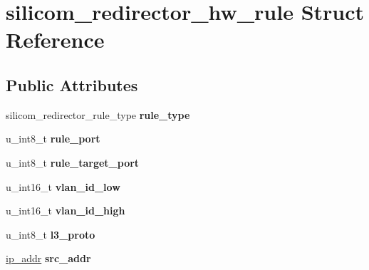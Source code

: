 \hypertarget{structsilicom__redirector__hw__rule}{
\section{silicom\_\-redirector\_\-hw\_\-rule Struct Reference}
\label{structsilicom__redirector__hw__rule}
}
\subsection*{Public Attributes}
\begin{DoxyCompactItemize}
\item 
\hypertarget{structsilicom__redirector__hw__rule_a94400e38ce1dbe2076efb81a71312cad}{
silicom\_\-redirector\_\-rule\_\-type {\bfseries rule\_\-type}}
\label{structsilicom__redirector__hw__rule_a94400e38ce1dbe2076efb81a71312cad}

\item 
\hypertarget{structsilicom__redirector__hw__rule_a68b2d4ea6dda27a16525a857ec9579fc}{
u\_\-int8\_\-t {\bfseries rule\_\-port}}
\label{structsilicom__redirector__hw__rule_a68b2d4ea6dda27a16525a857ec9579fc}

\item 
\hypertarget{structsilicom__redirector__hw__rule_ac38f745295b828ed7499fc415475ec9f}{
u\_\-int8\_\-t {\bfseries rule\_\-target\_\-port}}
\label{structsilicom__redirector__hw__rule_ac38f745295b828ed7499fc415475ec9f}

\item 
\hypertarget{structsilicom__redirector__hw__rule_a7f5b0833487ddc9dabb3278274e35c2e}{
u\_\-int16\_\-t {\bfseries vlan\_\-id\_\-low}}
\label{structsilicom__redirector__hw__rule_a7f5b0833487ddc9dabb3278274e35c2e}

\item 
\hypertarget{structsilicom__redirector__hw__rule_a3b32c6d67f73e69c6a073b5d4f47c900}{
u\_\-int16\_\-t {\bfseries vlan\_\-id\_\-high}}
\label{structsilicom__redirector__hw__rule_a3b32c6d67f73e69c6a073b5d4f47c900}

\item 
\hypertarget{structsilicom__redirector__hw__rule_aedeafa39ab6ae760fb94cf99e20b13c9}{
u\_\-int8\_\-t {\bfseries l3\_\-proto}}
\label{structsilicom__redirector__hw__rule_aedeafa39ab6ae760fb94cf99e20b13c9}

\item 
\hypertarget{structsilicom__redirector__hw__rule_a7d3b9697f7a6b25dec41536cbfac6b05}{
\hyperlink{unionip__addr}{ip\_\-addr} {\bfseries src\_\-addr}}
\label{structsilicom__redirector__hw__rule_a7d3b9697f7a6b25dec41536cbfac6b05}


\end{DoxyCompactItemize}
